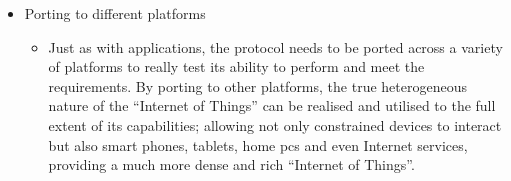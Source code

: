 \begin{itemize}
\begin{itemize}
	\end{itemize}
	\item Porting to different platforms
	\begin{itemize}
		\item Just as with applications, the protocol needs to be ported across a variety of platforms to really test its ability to perform and meet the requirements. By porting to other platforms, the true heterogeneous nature of the ``Internet of Things'' can be realised and utilised to the full extent of its capabilities; allowing not only constrained devices to interact but also smart phones, tablets, home pcs and even Internet services, providing a much more dense and rich ``Internet of Things''.
	\end{itemize}
\end{itemize}



